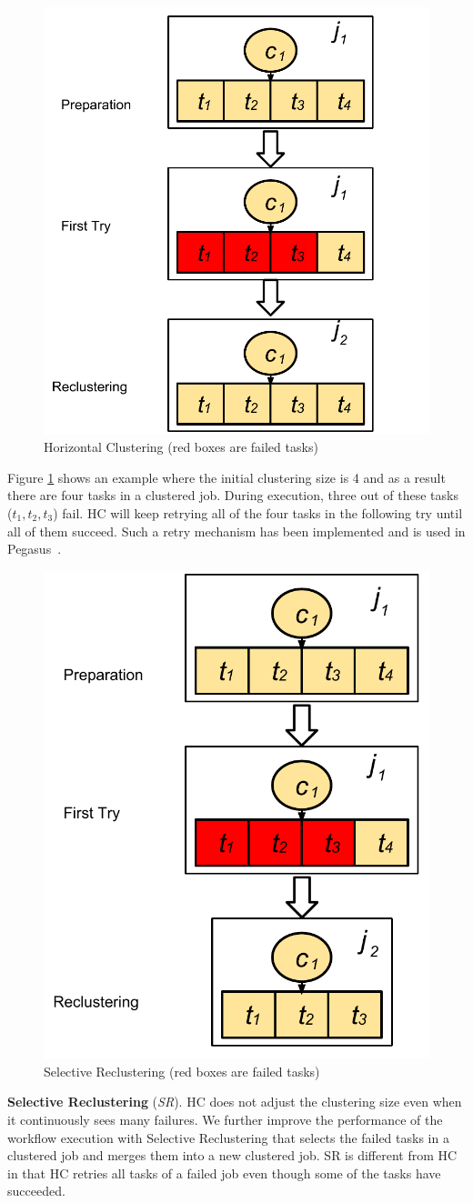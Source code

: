 \documentclass{IOS-Book-Article}
\begin{document}
\begin{figure}[!htb]
\centering
  \includegraphics[width=0.45\linewidth]{hcr.pdf}
  \caption{Horizontal Clustering (red boxes are failed tasks)}
  \label{fig:clustering_hc}
\end{figure}

Figure \ref{fig:clustering_hc} shows an example where the initial clustering size is 4 and as a result there are four tasks in a clustered job. During execution, three out of these tasks ($t_1, t_2, t_3$) fail. HC will keep retrying all of the four tasks in the following try until all of them succeed. Such a retry mechanism has been implemented and is used in Pegasus~\cite{Singh2008}.




\begin{figure}[!htb]
\centering
  \includegraphics[width=0.40\linewidth]{sr.pdf}
  \caption{Selective Reclustering (red boxes are failed tasks)}
  \label{fig:clustering_sr}
\end{figure}

\textbf{Selective Reclustering} (\emph{SR}). HC does not adjust the clustering size even when it continuously sees many failures. We further improve the performance of the workflow execution with Selective Reclustering that selects the failed tasks in a clustered job and merges them into a new clustered job. SR is different from HC in that HC retries all tasks of a failed job even though some of the tasks have succeeded. 
\end{document}
